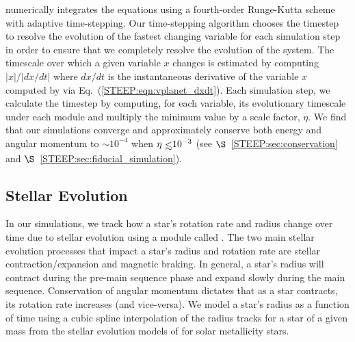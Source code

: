 \vplanet numerically integrates the equations using a fourth-order Runge-Kutta scheme with adaptive time-stepping.  Our time-stepping algorithm chooses the timestep to resolve the evolution of the fastest changing variable for each simulation step in order to ensure that we completely resolve the evolution of the system.  The timescale over which a given variable $x$ changes is estimated by computing $|x|/|dx/dt|$ where $dx/dt$ is the instantaneous derivative of the variable $x$ computed by \vplanet via Eq.~(\ref{STEEP:eqn:vplanet_dxdt}).  Each simulation step, we calculate the timestep by computing, for each variable, its evolutionary timescale under each module and multiply the minimum value by a scale factor, $\eta$.   We find that our simulations converge and approximately conserve both energy and angular momentum to ${\sim}10^{-4}$ when $\eta \lsim 10^{-3}$ (see $\S$~\ref{STEEP:sec:conservation} and $\S$~\ref{STEEP:sec:fiducial_simulation}).



\subsection{Stellar Evolution} \label{STEEP:sec:stellar_evolution}

In our simulations, we track how a star's rotation rate and radius change over time due to stellar evolution using a module called \stellar.  The two main stellar evolution processes that impact a star's radius and rotation rate are stellar contraction/expansion and magnetic braking.  In general, a star's radius will contract during the pre-main sequence phase and expand slowly during the main sequence.  Conservation of angular momentum dictates that as a star contracts, its rotation rate increases (and vice-versa).  We model a star's radius as a function of time using a cubic spline interpolation of the radius tracks for a star of a given mass from the stellar evolution models of \citet{Baraffe2015} for solar metallicity stars.

